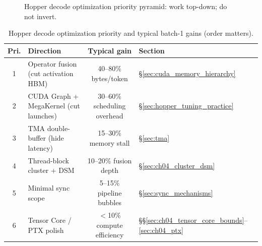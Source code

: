 \begin{figure}[t]
\centering
{}
\caption{Hopper decode optimization priority pyramid: work top-down; do not invert.}
\label{fig:hopper_priority_pyramid}
\end{figure}

\begin{table}[t]
\centering
\small
\caption{Hopper decode optimization priority and typical batch-1 gains (order matters).}
\label{tab:hopper_priority_pyramid}
\begin{tabular}{@{}clcl@{}}
\toprule
\textbf{Pri.} & \textbf{Direction} & \textbf{Typical gain} & \textbf{Section} \\
\midrule
1 & Operator fusion (cut activation HBM) & 40--80\% bytes/token & \S\ref{sec:cuda_memory_hierarchy} \\
2 & CUDA Graph + MegaKernel (cut launches) & 30--60\% scheduling overhead & \S\ref{sec:hopper_tuning_practice} \\
3 & TMA double-buffer (hide latency) & 15--30\% memory stall & \S\ref{sec:tma} \\
4 & Thread-block cluster + DSM & 10--20\% fusion depth & \S\ref{sec:ch04_cluster_dsm} \\
5 & Minimal sync scope & 5--15\% pipeline bubbles & \S\ref{sec:sync_mechanisms} \\
6 & Tensor Core / PTX polish & $<$10\% compute efficiency & \S\S\ref{sec:ch04_tensor_core_bounds}--\ref{sec:ch04_ptx} \\
\bottomrule
\end{tabular}
\end{table}


